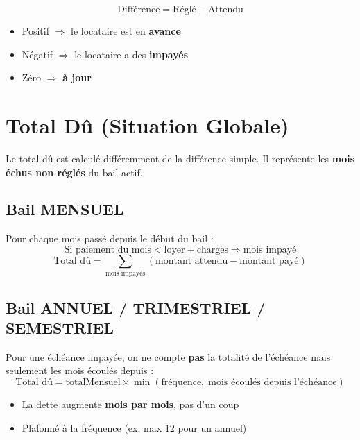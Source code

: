 \documentclass[a4paper,12pt]{article}
\begin{document}
\begin{formulebox}[Différence]
\begin{equation}
\text{Différence} = \text{Réglé} - \text{Attendu}
\end{equation}
\vspace{-0.3cm}
\begin{itemize}[noitemsep]
  \item Positif $\Rightarrow$ le locataire est en \textbf{avance}
  \item Négatif $\Rightarrow$ le locataire a des \textbf{impayés}
  \item Zéro $\Rightarrow$ \textbf{à jour}
\end{itemize}
\end{formulebox}

\section{Total Dû (Situation Globale)}

Le total dû est calculé différemment de la différence simple. Il représente les \textbf{mois échus non réglés} du bail actif.

\subsection{Bail MENSUEL}

\begin{formulebox}
Pour chaque mois passé depuis le début du bail :
\begin{equation}
\text{Si paiement du mois} < \text{loyer} + \text{charges} \Rightarrow \text{mois impayé}
\end{equation}
\begin{equation}
\text{Total dû} = \sum_{\text{mois impayés}} (\text{montant attendu} - \text{montant payé})
\end{equation}
\end{formulebox}

\subsection{Bail ANNUEL / TRIMESTRIEL / SEMESTRIEL}

\begin{formulebox}
Pour une échéance impayée, on ne compte \textbf{pas} la totalité de l'échéance mais seulement les mois écoulés depuis :
\begin{equation}
\text{Total dû} = \text{totalMensuel} \times \min(\text{fréquence},\; \text{mois écoulés depuis l'échéance})
\end{equation}
\vspace{-0.3cm}
\begin{itemize}[noitemsep]
  \item La dette augmente \textbf{mois par mois}, pas d'un coup
  \item Plafonné à la fréquence (ex: max 12 pour un annuel)
\end{itemize}
\end{formulebox}
\end{document}
